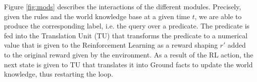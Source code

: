 Figure \ref{fig:mods} describes the interactions of the different modules. Precisely, 
given the rules and the world knowledge base at a given time $t$, we are able 
to produce the corresponding label, i.e. the query over a predicate. The predicate is fed 
into the Translation Unit (TU) that transforms the predicate to a numerical value that is given to the Reinforcement Learning 
as a reward shaping $r'$ added to the original reward given by the
environment. As a result of the RL action, the next state is given 
to TU that translates it into Ground facts to update the world
knowledge, thus restarting the loop.
